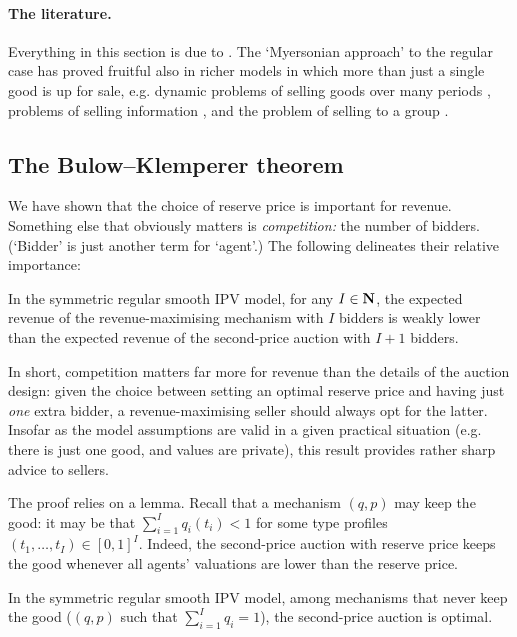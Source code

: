 \paragraph{The literature.}
Everything in this section is due to \textcite{Myerson1981}.
The `Myersonian approach' to the regular case has proved fruitful also in richer models in which more than just a single good is up for sale,
e.g. dynamic problems of selling goods over many periods \parencite{PavanSegalToikka2014}, problems of selling information \parencite{Yang2022}, and the problem of selling to a group \parencite{HaghpanahKuvalekarLipnowski2022}.



\subsection{The Bulow--Klemperer theorem}
\label{sec:ch2:bulow-klemperer}

We have shown that the choice of reserve price is important for revenue.
Something else that obviously matters is \emph{competition:} the number of bidders. (`Bidder' is just another term for `agent'.)
The following delineates their relative importance:

\begin{namedthm}
	\label{theorem:BulowKlemperer}
	In the symmetric regular smooth IPV model,
	for any $I \in \mathbf{N}$,
	the expected revenue of the revenue-maximising mechanism with $I$ bidders
	is weakly lower than the expected revenue of the second-price auction with $I+1$ bidders.
\end{namedthm}

In short, competition matters far more for revenue than the details of the auction design:
given the choice between setting an optimal reserve price
and having just \emph{one} extra bidder,
a revenue-maximising seller should always opt for the latter.
Insofar as the model assumptions are valid in a given practical situation (e.g. there is just one good, and values are private), this result provides rather sharp advice to sellers.


The proof relies on a lemma.
Recall that a mechanism $(q,p)$ may keep the good:
it may be that $\sum_{i=1}^I q_i(t_i) < 1$ for some type profiles $(t_1,\dots,t_I) \in [0,1]^I$.
Indeed, the second-price auction with reserve price keeps the good whenever all agents' valuations are lower than the reserve price.
%
\begin{lemma}
	\label{lemma:MyersonMustallocate}
	In the symmetric regular smooth IPV model,
	among mechanisms that never keep the good
	($(q,p)$ such that $\sum_{i=1}^I q_i = 1$),
	the second-price auction
	is optimal.
\end{lemma}

